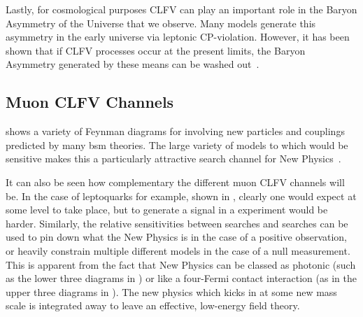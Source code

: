 Lastly, for cosmological purposes \ac{CLFV} can play an important role in the Baryon Asymmetry of the Universe that we observe.
Many models generate this asymmetry in the early universe via leptonic CP-violation.
However, it has been shown that if \ac{CLFV} processes occur at the present limits, the Baryon Asymmetry generated by these means can be washed out~\cite{}.

\subsection{Muon CLFV Channels}
\FigTheoryMuEConvNewPhysics
{} shows a variety of Feynman diagrams for \mueconv involving new particles and couplings predicted by many \ac{bsm} theories.
The large variety of models to which \mueconv would be sensitive makes this a particularly attractive search channel for New Physics~\cite{Altmannshofer2009ne}.

It can also be seen how complementary the different muon CLFV channels will be.
In the case of leptoquarks for example, shown in , clearly one would expect at some level \mueconv to take place, but to generate a signal in a \muThreeE experiment would be harder.
Similarly, the relative sensitivities between \mueg searches and \mueconv searches can be used to pin down what the New Physics is in the case of a positive observation, or heavily constrain multiple different models in the case of a null measurement.
This is apparent from the fact that New Physics can be classed as photonic (such as the lower three diagrams in ) or like a four-Fermi contact interaction (as in the upper three diagrams in ).
The new physics which kicks in at some new mass scale is integrated away to leave an effective, low-energy field theory.

